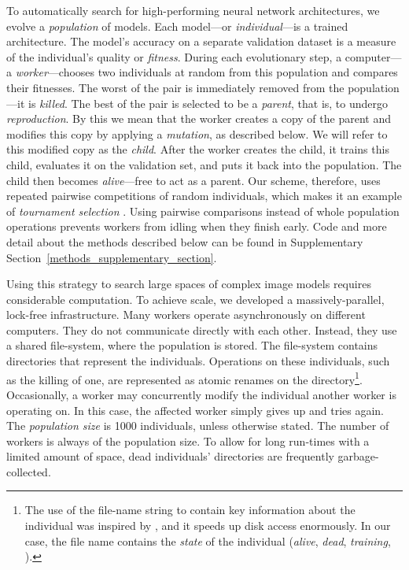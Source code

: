 \documentclass{article}
\renewcommand{\cite}[1]{\citep{#1}}
\begin{document}
To automatically search for high-performing neural network architectures, we evolve a {\em population} of models. Each model---or {\em individual}---is a trained architecture. The model's accuracy on a separate validation dataset is a measure of the individual's quality or {\em fitness}. During each evolutionary step, a computer---a {\em worker}---chooses two individuals at random from this population and compares their fitnesses. The worst of the pair is immediately removed from the population---it is {\em killed}. The best of the pair is selected to be a {\em parent}, that is, to undergo {\em reproduction}. By this we mean that the worker creates a copy of the parent and modifies this copy by applying a {\em mutation}, as described below. We will refer to this modified copy as the {\em child}. After the worker creates the child, it trains this child, evaluates it on the validation set, and puts it back into the population. The child then becomes {\em alive}---\ie free to act as a parent. Our scheme, therefore, uses repeated pairwise competitions of random individuals, which makes it an example of {\em tournament selection} \cite{goldberg1991comparative}. Using pairwise comparisons instead of whole population operations prevents workers from idling when they finish early. Code and more detail about the methods described below can be found in Supplementary Section~\ref{methods_supplementary_section}.

Using this strategy to search large spaces of complex image models requires considerable computation. To achieve scale, we developed a massively-parallel, lock-free infrastructure. Many workers operate asynchronously on different computers. They do not communicate directly with each other. Instead, they use a shared file-system, where the population is stored. The file-system contains directories that represent the individuals. Operations on these individuals, such as the killing of one, are represented as atomic renames on the directory\footnote{The use of the file-name string to contain key information about the individual was inspired by \citet{breuel2010automlp}, and it speeds up disk access enormously. In our case, the file name contains the {\em state} of the individual ({\em alive}, {\em dead}, {\em training}, \etc).}. Occasionally, a worker may concurrently modify the individual another worker is operating on. In this case, the affected worker simply gives up and tries again. The {\em population size} is 1000 individuals, unless otherwise stated. The number of workers is always  of the population size. To allow for long run-times with a limited amount of space, dead individuals' directories are frequently garbage-collected.
\end{document}
